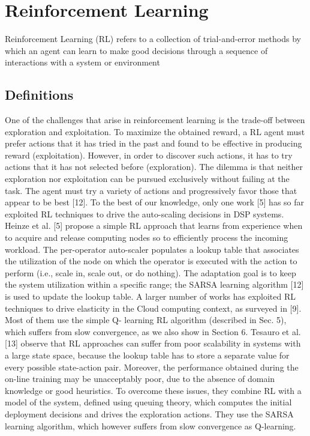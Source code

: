 \chapter{Reinforcement Learning}
\label{chp:reinforcement-learning}


\lipsum[1]

Reinforcement
Learning (RL) refers to a collection of trial-and-error methods by which an agent
can learn to make good decisions through a sequence of interactions with a
system or environment


\section{Definitions}
\label{sec:reinforcement-learning-definitions}

One
of the challenges that arise in reinforcement learning is the trade-off between
exploration and exploitation. To maximize the obtained reward, a RL agent
must prefer actions that it has tried in the past and found to be effective in
producing reward (exploitation). However, in order to discover such actions, it
has to try actions that it has not selected before (exploration). The dilemma
is that neither exploration nor exploitation can be pursued exclusively without
failing at the task. The agent must try a variety of actions and progressively
favor those that appear to be best [12]. To the best of our knowledge, only one
work [5] has so far exploited RL techniques to drive the auto-scaling decisions in
DSP systems. Heinze et al. [5] propose a simple RL approach that learns from
experience when to acquire and release computing nodes so to efficiently process
the incoming workload. The per-operator auto-scaler populates a lookup table
that associates the utilization of the node on which the operator is executed with
the action to perform (i.e., scale in, scale out, or do nothing). The adaptation
goal is to keep the system utilization within a specific range; the SARSA learning
algorithm [12] is used to update the lookup table.
A larger number of works has exploited RL techniques to drive elasticity in
the Cloud computing context, as surveyed in [9]. Most of them use the simple Q-
learning RL algorithm (described in Sec. 5), which suffers from slow convergence,
as we also show in Section 6. Tesauro et al. [13] observe that RL approaches
can suffer from poor scalability in systems with a large state space, because
the lookup table has to store a separate value for every possible state-action
pair. Moreover, the performance obtained during the on-line training may be
unacceptably poor, due to the absence of domain knowledge or good heuristics.
To overcome these issues, they combine RL with a model of the system, defined
using queuing theory, which computes the initial deployment decisions and drives
the exploration actions. They use the SARSA learning algorithm, which however
suffers from slow convergence as Q-learning.

